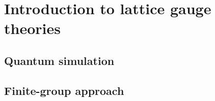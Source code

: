\chapter{Introduction to lattice gauge theories}
\label{chap:introduction_to_lattice_gauge_theories}











\section{Quantum simulation}
\label{sec:quantum_simulation}

\section{Finite-group approach}
\label{sec:finite_group_approach}
